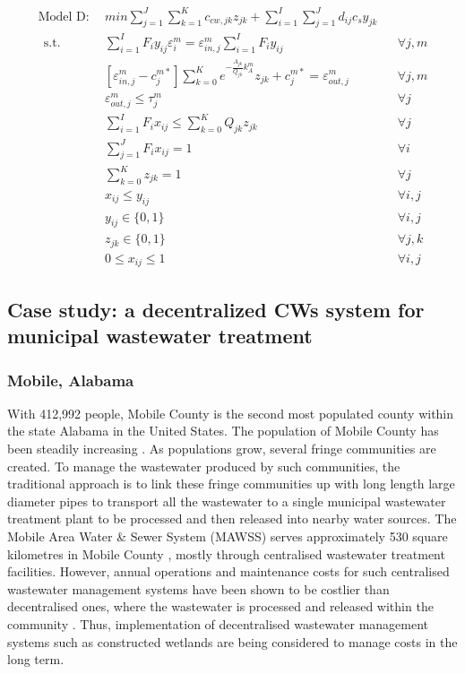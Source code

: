 \documentclass[preprint,12pt,authoryear]{elsarticle}
\begin{document}
\begin{equation*}\label{modelD}
\begin{aligned}
	\text{Model D}:~~&min \sum_{j=1}^{J}\sum_{k=1}^{K}c_{cw,jk}z_{jk}+\sum_{i=1}^{I}\sum_{j=1}^{J}d_{ij}c_sy_{jk}\\~~\mbox{s.t.}~~
	&{\sum_{i=1}^{I}F_{i}y_{ij}\varepsilon_{i}^{m}} = \varepsilon_{in,j}^{m}{\sum_{i=1}^{I}F_{i}y_{ij}}&&\forall j,m\\
	&[\varepsilon_{in,j}^{m}-{c}_{j}^{m*}]\sum_{k=0}^{K}e^{-\frac{A_{jk}}{Q_{jk}}k_{A}^{m}}z_{jk}+c_{j}^{m*} = \varepsilon_{out,j}^{m}&&\forall j,m\\
	&\varepsilon_{out,j}^{m}\leq \tau_{j}^{m}&&\forall j\\
	&\sum_{i=1}^{I}F_{i}x_{ij}\leq\sum_{k = 0}^{K}Q_{jk}z_{jk}&&\forall j\\
	&\sum_{j=1}^{J}F_{i}x_{ij} = 1&&\forall i\\
	&\sum_{k=0}^{K}z_{jk} = 1&&\forall j\\
	&x_{ij}\leq y_{ij}&&\forall i,j\\
	&y_{ij} \in \{0,1\}&&\forall i,j\\
	&z_{jk} \in \{0,1\}&&\forall j,k\\
	&0 \leq x_{ij} \leq 1&&\forall i,j
\end{aligned}
\end{equation*}

\subsection{Case study: a decentralized CWs system for municipal wastewater treatment}
\subsubsection{Mobile, Alabama}
With 412,992 people, Mobile County is the second most populated county within the state Alabama in the United States. The population of Mobile County has been steadily increasing \citep{uscb2002census}. As populations grow, several fringe communities are created. To manage the wastewater produced by such communities, the traditional approach is to link these fringe communities up with long length large diameter pipes to transport all the wastewater to a single municipal wastewater treatment plant to be processed and then released into nearby water sources. The Mobile Area Water \& Sewer System (MAWSS) serves approximately 530 square kilometres in Mobile County \citep{mawss2015}, mostly through centralised wastewater treatment facilities. However, annual operations and maintenance costs for such centralised wastewater management systems have been shown to be costlier than decentralised ones, where the wastewater is processed and released within the community \citep{mawss2015}. Thus, implementation of decentralised wastewater management systems such as constructed wetlands are being considered to manage costs in the long term. 
\end{document}
